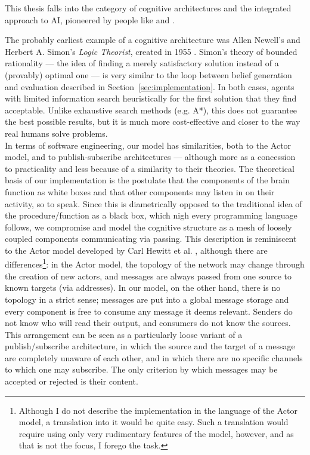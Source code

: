 This thesis falls into the category of cognitive architectures and the integrated approach to AI, pioneered by people like  and  .

The probably earliest example of a cognitive architecture was Allen Newell's and Herbert A. Simon's {\em Logic Theorist}, created in 1955 . Simon's theory of bounded rationality --- the idea of finding a merely satisfactory solution instead of a (provably) optimal one --- is very similar to the loop between belief generation and evaluation described in Section~\ref{sec:implementation}. In both cases, agents with limited information search heuristically for the first solution that they find acceptable. Unlike exhaustive search methods (e.g. A*), this does not guarantee the best possible results, but it is much more cost-effective and closer to the way real humans solve problems.\\

In terms of software engineering, our model has similarities, both to the Actor model, and to publish-subscribe architectures  --- although more as a concession to practicality and less because of a similarity to their theories. The theoretical basis of our implementation is the postulate that the components of the brain function as white boxes and that other components may listen in on their activity, so to speak. Since this is diametrically opposed to the traditional idea of the procedure/function as a black box, which nigh every programming language follows, we compromise and model the cognitive structure as a mesh of loosely coupled components communicating via passing. This description is reminiscent to the Actor model developed by Carl Hewitt et al. \cite{hewittActor}, although there are differences\footnote{Although I do not describe the implementation in the language of the Actor model, a translation into it would be quite easy. Such a translation would require using only very rudimentary features of the model, however, and as that is not the focus, I forego the task.}: in the Actor model, the topology of the network may change through the creation of new actors, and messages are always passed from one source to known targets (via addresses). In our model, on the other hand, there is no topology in a strict sense; messages are put into a global message storage and every component is free to consume any message it deems relevant. Senders do not know who will read their output, and consumers do not know the sources. This arrangement can be seen as a particularly loose variant of a publish/subscribe architecture, in which the source and the target of a message are completely unaware of each other, and in which there are no specific channels to which one may subscribe. The only criterion by which messages may be accepted or rejected is their content.

